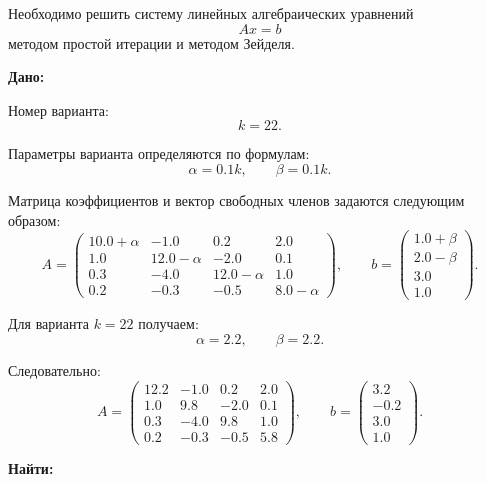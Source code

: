 
Необходимо решить систему линейных алгебраических уравнений
\[
    Ax = b
\]
методом простой итерации и методом Зейделя.

\textbf{Дано:}

Номер варианта:
\[
    k = 22.
\]

Параметры варианта определяются по формулам:
\[
    \alpha = 0.1k, \qquad \beta = 0.1k.
\]

Матрица коэффициентов и вектор свободных членов задаются следующим образом:
\[
A =
\begin{pmatrix}
10.0+\alpha & -1.0 & 0.2 & 2.0 \\
1.0 & 12.0-\alpha & -2.0 & 0.1 \\
0.3 & -4.0 & 12.0-\alpha & 1.0 \\
0.2 & -0.3 & -0.5 & 8.0-\alpha
\end{pmatrix},
\qquad
b =
\begin{pmatrix}
1.0+\beta \\
2.0-\beta \\
3.0 \\
1.0
\end{pmatrix}.
\]

Для варианта $k = 22$ получаем:
\[
    \alpha = 2.2, \qquad \beta = 2.2.
\]

Следовательно:
\[
A =
\begin{pmatrix}
12.2 & -1.0 & 0.2 & 2.0 \\
1.0 & 9.8 & -2.0 & 0.1 \\
0.3 & -4.0 & 9.8 & 1.0 \\
0.2 & -0.3 & -0.5 & 5.8
\end{pmatrix},
\qquad
b =
\begin{pmatrix}
3.2 \\
-0.2 \\
3.0 \\
1.0
\end{pmatrix}.
\]

\textbf{Найти:}

